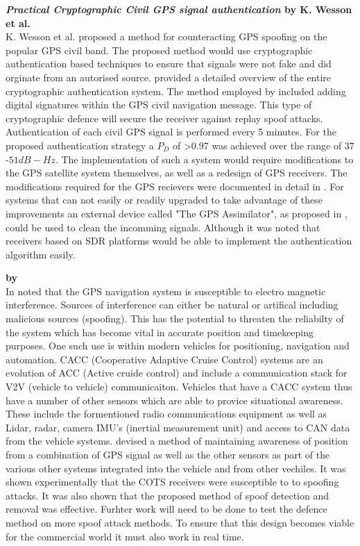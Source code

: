 \medskip

\textbf{\emph{Practical Cryptographic Civil GPS signal authentication} by K. Wesson et al.} \\
K. Wesson et al. \cite{RN13} proposed a method for counteracting GPS spoofing on the popular GPS civil band. The proposed method would use cryptographic
authentication based techniques to ensure that signals were not fake and did orginate from an autorised source.
\citeauthor{RN13} provided a detailed overview of the entire cryptographic authentication system.
The method employed by \citeauthor{RN13} included adding digital signatures within the GPS civil navigation message. This type of cryptographic defence
will secure the receiver against replay spoof attacks. Authentication of each civil GPS signal is performed every 5 minutes.
For the proposed authentication strategy a $P_D$ of >0.97 was achieved over the range of $37$-$51 dB-Hz$.
The implementation of such a system would require modifications to the GPS satellite system themselves, as well as a redesign of GPS receivers.
The modifications required for the GPS recievers were documented in detail in \cite{RN13}. For systems that can not easily or readily upgraded to
take advantage of these improvements an external device called "The GPS Assimilator", as proposed in \cite{RN19}, could be used to clean the incomming
signals.
Although it was noted that receivers based on SDR platforms would be able to implement the authentication algorithm easily.

\medskip

\textbf{\emph{} by \citeauthor{RN17}} \\
In \citeyear{RN17} \citeauthor{RN17} \cite{RN17} noted that the GPS navigation system is susceptible to electro magnetic interference. Sources of interference 
can either be natural or artifical including malicious sources (spoofing). This has the potential to threaten the reliabilty of the system which has become 
vital in accurate position and timekeeping purposes. One such use is within modern vehicles for positioning, navigation and automation. 
CACC (Cooperative Adaptive Cruise Control) systems are an evolution of ACC (Active cruide control) and include a communication stack for V2V (vehicle to vehicle) communicaiton. 
Vehicles that have a CACC system thus have a number of other sensors which are able to provice situational awareness. These include the formentioned radio
communications equipment as well as Lidar, radar, camera  IMU's (inertial measurement unit) and access to CAN data from the vehicle systems.
\citeauthor{RN17} devised a method of maintaining awareness of position from a combination of GPS signal as well as the other sensors as part of
the various other systems integrated into the vehicle and from other vechiles. It was shown experimentally that the COTS receivers were susceptible to
to spoofing attacks. It was also shown that the proposed method of spoof detection and removal was effective. Furhter work will need to be done
to test the defence method on more spoof attack methods. To ensure that this design becomes viable for the commercial world it must also work in real time.

